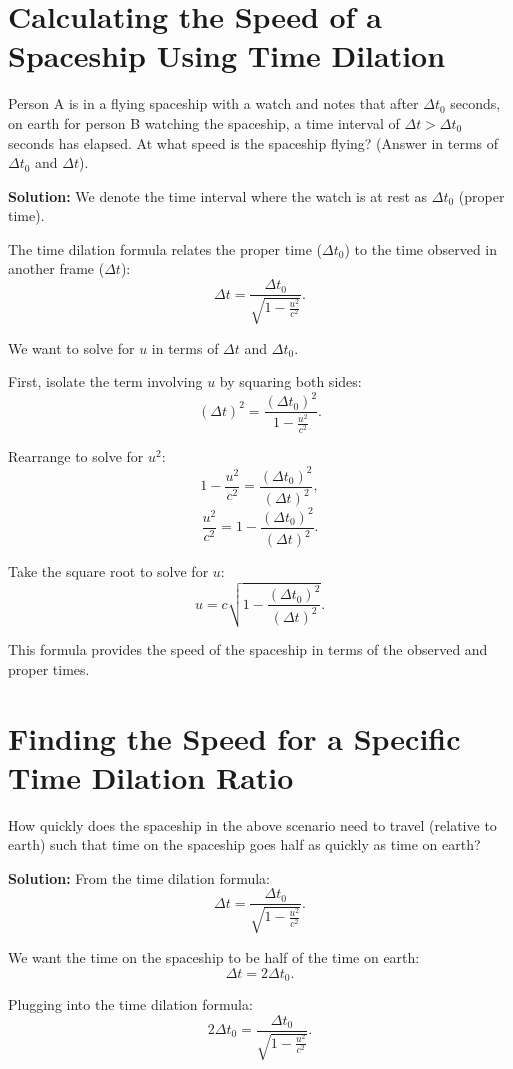 \documentclass[a4paper,12pt]{article}
\begin{document}
\begin{multicols}{2}
\section*{Calculating the Speed of a Spaceship Using Time Dilation}
Person A is in a flying spaceship with a watch and notes that after \( \Delta t_0 \) seconds, on earth for person B watching the spaceship, a time interval of \( \Delta t > \Delta t_0 \) seconds has elapsed. At what speed is the spaceship flying? (Answer in terms of \( \Delta t_0 \) and \( \Delta t \)).

\textbf{Solution:} We denote the time interval where the watch is at rest as \( \Delta t_0 \) (proper time). 

The time dilation formula relates the proper time (\( \Delta t_0 \)) to the time observed in another frame (\( \Delta t \)):
\[
\Delta t = \frac{\Delta t_0}{\sqrt{1 - \frac{u^2}{c^2}}}. \tag{L1}
\]

We want to solve for \( u \) in terms of \( \Delta t \) and \( \Delta t_0 \).

First, isolate the term involving \( u \) by squaring both sides:
\[
(\Delta t)^2 = \frac{(\Delta t_0)^2}{1 - \frac{u^2}{c^2}}.
\]

Rearrange to solve for \( u^2 \):
\[
1 - \frac{u^2}{c^2} = \frac{(\Delta t_0)^2}{(\Delta t)^2},
\]
\[
\frac{u^2}{c^2} = 1 - \frac{(\Delta t_0)^2}{(\Delta t)^2}. \tag{L2}
\]

Take the square root to solve for \( u \):
\[
u = c \sqrt{1 - \frac{(\Delta t_0)^2}{(\Delta t)^2}}. \tag{L3}
\]

This formula provides the speed of the spaceship in terms of the observed and proper times.

\section*{Finding the Speed for a Specific Time Dilation Ratio}
How quickly does the spaceship in the above scenario need to travel (relative to earth) such that time on the spaceship goes half as quickly as time on earth?

\textbf{Solution:} From the time dilation formula:
\[
\Delta t = \frac{\Delta t_0}{\sqrt{1 - \frac{u^2}{c^2}}}. \tag{L4}
\]

We want the time on the spaceship to be half of the time on earth:
\[
\Delta t = 2 \Delta t_0.
\]

Plugging into the time dilation formula:
\[
2 \Delta t_0 = \frac{\Delta t_0}{\sqrt{1 - \frac{u^2}{c^2}}}.
\]


\end{multicols}
\end{document}
